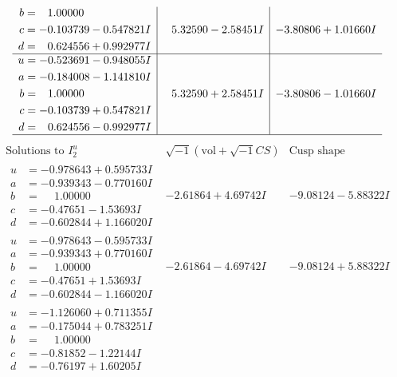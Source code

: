 \documentclass[1p]{elsarticle_modified}
\theoremstyle{definition}
\newcommand{\I}{\sqrt{-1}}
\begin{document}
$$\begin{array}{c|c|c}
\begin{aligned}
b &= \phantom{-}1.00000\phantom{ +0.000000I} \\
c &= -0.103739 - 0.547821 I \\
d &= \phantom{-}0.624556 + 0.992977 I\end{aligned}
 & \phantom{-}5.32590 - 2.58451 I & -3.80806 + 1.01660 I \\ \hline\begin{aligned}
u &= -0.523691 - 0.948055 I \\
a &= -0.184008 - 1.141810 I \\
b &= \phantom{-}1.00000\phantom{ +0.000000I} \\
c &= -0.103739 + 0.547821 I \\
d &= \phantom{-}0.624556 - 0.992977 I\end{aligned}
 & \phantom{-}5.32590 + 2.58451 I & -3.80806 - 1.01660 I\\
 \hline 
 \end{array}$$\newpage$$\begin{array}{c|c|c}  
\text{Solutions to }I^u_{2}& \I (\text{vol} + \sqrt{-1}CS) & \text{Cusp shape}\\
 \hline 
\begin{aligned}
u &= -0.978643 + 0.595733 I \\
a &= -0.939343 - 0.770160 I \\
b &= \phantom{-}1.00000\phantom{ +0.000000I} \\
c &= -0.47651 - 1.53693 I \\
d &= -0.602844 + 1.166020 I\end{aligned}
 & -2.61864 + 4.69742 I & -9.08124 - 5.88322 I \\ \hline\begin{aligned}
u &= -0.978643 - 0.595733 I \\
a &= -0.939343 + 0.770160 I \\
b &= \phantom{-}1.00000\phantom{ +0.000000I} \\
c &= -0.47651 + 1.53693 I \\
d &= -0.602844 - 1.166020 I\end{aligned}
 & -2.61864 - 4.69742 I & -9.08124 + 5.88322 I \\ \hline\begin{aligned}
u &= -1.126060 + 0.711355 I \\
a &= -0.175044 + 0.783251 I \\
b &= \phantom{-}1.00000\phantom{ +0.000000I} \\
c &= -0.81852 - 1.22144 I \\
d &= -0.76197 + 1.60205 I\end{aligned}

\end{array}$$
\end{document}
